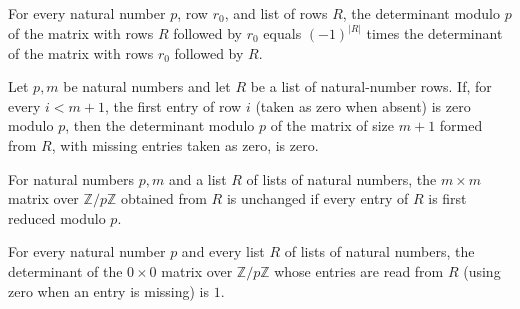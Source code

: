 \begin{theorem}
\label{Complexity.BinArith.det_matOfRows_rotate}
\leanok
{}
For every natural number $p$, row $r_0$, and list of rows $R$, the determinant modulo
$p$ of the matrix with rows $R$ followed by $r_0$ equals $(-1)^{|R|}$ times the
determinant of the matrix with rows $r_0$ followed by $R$.
\end{theorem}

\begin{theorem}
\label{Complexity.BinArith.det_matOfRows_eq_zero}
\leanok
{}
Let $p,m$ be natural numbers and let $R$ be a list of natural-number rows. If, for every
$i<m+1$, the first entry of row $i$ (taken as zero when absent) is zero modulo $p$, then
the determinant modulo $p$ of the matrix of size $m+1$ formed from $R$, with missing
entries taken as zero, is zero.
\end{theorem}

\begin{theorem}
\label{Complexity.BinArith.matOfRows_map_mod}
\leanok
{}
For natural numbers $p,m$ and a list $R$ of lists of natural numbers, the $m\times m$
matrix over $\mathbb Z/p\mathbb Z$ obtained from $R$ is unchanged if every entry of $R$
is first reduced modulo $p$.
\end{theorem}

\begin{theorem}
\label{Complexity.BinArith.det_matOfRows_zero}
\leanok
{}
For every natural number $p$ and every list $R$ of lists of natural numbers, the
determinant of the $0\times 0$ matrix over $\mathbb{Z}/p\mathbb{Z}$ whose entries are
read from $R$ (using zero when an entry is missing) is $1$.
\end{theorem}

